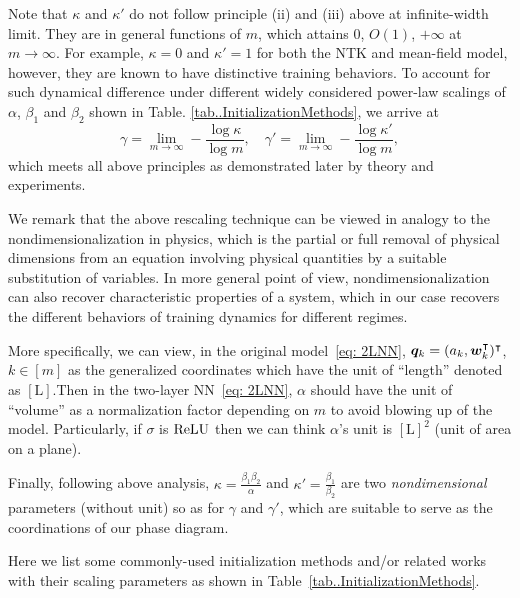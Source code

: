 \documentclass[twoside,11pt]{article}
\begin{document}
Note that $\kappa$ and $\kappa'$ do not follow principle (ii) and (iii) above at infinite-width limit. They are in general functions of $m$, which attains $0$, $O(1)$, $+\infty$ at $m\to\infty$. For example, $\kappa=0$ and $\kappa'=1$ for both the NTK and mean-field model, however, they are known to have distinctive training behaviors. To account for such dynamical difference under different widely considered power-law scalings of $\alpha$, $\beta_1$ and $\beta_2$ shown in Table. \ref{tab..InitializationMethods}, we arrive at
\begin{equation}
    \gamma=\lim_{m\to\infty}-\frac{\log \kappa}{\log m}, \quad \gamma'=\lim_{m\to\infty}-\frac{\log\kappa'}{\log m},
\end{equation}
which meets all above principles as demonstrated later by theory and experiments.

\begin{rmk}
    We remark that the above rescaling technique can be viewed in analogy to the nondimensionalization in physics, which is the partial or full removal of physical dimensions from an equation involving physical quantities by a suitable substitution of variables. In more general point of view, nondimensionalization can also recover characteristic properties of a system, which in our case recovers the different behaviors of training dynamics for different regimes.

    More specifically, we can view, in the original model~\eqref{eq: 2LNN}, $\bm{q}_k=(a_k,\bm{w}_k^{\intercal})^\intercal$, $k\in[m]$ as the generalized coordinates which have the unit of ``length'' denoted as $[\mathrm{L}]$.\@ Then in the two-layer NN~\eqref{eq: 2LNN}, $\alpha$ should have the unit of ``volume'' as a normalization factor depending on $m$ to avoid blowing up of the model. Particularly, if $\sigma$ is $\mathrm{ReLU}$ then we can think $\alpha$'s unit is $[\mathrm{L}]^2$ (unit of area on a plane).

    Finally, following above analysis, $\kappa=\frac{\beta_1\beta_2}{\alpha}$ and $\kappa'=\frac{\beta_1}{\beta_2}$ are two \emph{nondimensional} parameters (without unit) so as for $\gamma$ and $\gamma'$, which are suitable to serve as the coordinations of our phase diagram.
\end{rmk}
\begin{rmk}
    Here we list some commonly-used initialization methods and/or related works with their scaling parameters as shown in Table~\ref{tab..InitializationMethods}.
\end{rmk}
\end{document}
